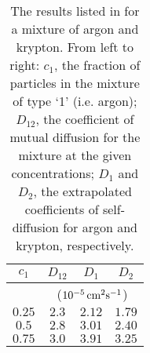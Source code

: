 \documentclass{article}
\begin{document}
\begin{table}[h!t]
\centering
\caption{ The results listed in \cite{StructureAndDiffusion} for a mixture of argon and krypton. From left to right: $c_1$, the fraction of particles in the mixture of type `1' (i.e. argon); $D_{12}$, the coefficient of mutual diffusion for the mixture at the given concentrations; $D_{1}$ and $D_2$, the extrapolated coefficients of self-diffusion for argon and krypton, respectively.}
\begin{tabular}{|c|c|c|c|} 
\hline
$c_1$ & $D_{12}$ & $D_1$ & $D_2$\\\hline
 & \multicolumn{3}{|c|}{($10^{-5}\,\rm{cm}^2\rm{s}^{-1}$)}\\\hline
$0.25$ & $2.3$ & $2.12$ & $1.79$\\
$0.5$ & $2.8$ & $3.01$ & $2.40$\\
$0.75$ & $3.0$ & $3.91$ & $3.25$\\\hline
\end{tabular}
\end{table} 




\end{document}
